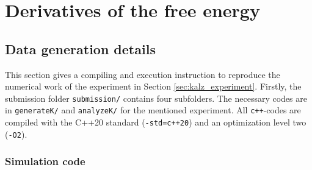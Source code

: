 
\chapter{Derivatives of the free energy}
\label{app:kalz}

\section{Data generation details}

This section gives a compiling and execution instruction to reproduce the numerical work of the experiment in Section \ref{sec:kalz_experiment}. 
Firstly, the submission folder
\verb|submission/| contains four subfolders. The necessary codes are in \verb|generateK/| and \verb|analyzeK/| for the mentioned experiment. All 
\verb|c++|-codes are compiled with the C++20 standard (\verb|-std=c++20|) and an optimization level two (\verb|-O2|).

\subsection*{Simulation code}

